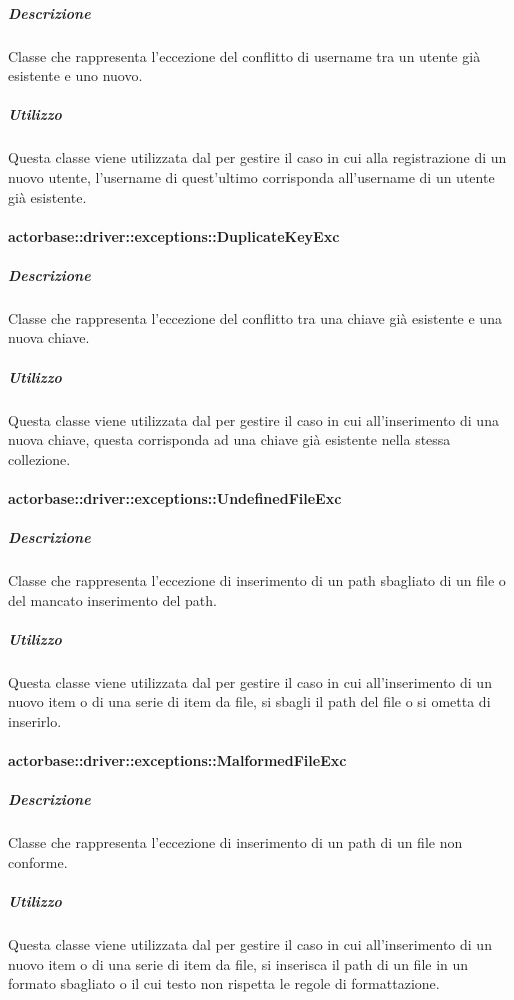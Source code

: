\documentclass{scalatekids-article}
\begin{document}
\subparagraph{Descrizione}

Classe che rappresenta l'eccezione del conflitto di username tra un utente già esistente e uno nuovo.

\subparagraph{Utilizzo}

Questa classe viene utilizzata dal  per gestire il caso in cui alla registrazione di un nuovo utente, l'username di quest'ultimo corrisponda all'username di un utente già esistente.

\paragraph{actorbase::driver::exceptions::DuplicateKeyExc}

\subparagraph{Descrizione}

Classe che rappresenta l'eccezione del conflitto tra una chiave già esistente e una nuova chiave.

\subparagraph{Utilizzo}

Questa classe viene utilizzata dal  per gestire il caso in cui all'inserimento di una nuova chiave, questa corrisponda ad una chiave già esistente nella stessa collezione.

\paragraph{actorbase::driver::exceptions::UndefinedFileExc}

\subparagraph{Descrizione}

Classe che rappresenta l'eccezione di inserimento di un path sbagliato di un file o del mancato inserimento del path.

\subparagraph{Utilizzo}

Questa classe viene utilizzata dal  per gestire il caso in cui all'inserimento di un nuovo item o di una serie di item da file, si sbagli il path del file o si ometta di inserirlo.

\paragraph{actorbase::driver::exceptions::MalformedFileExc}

\subparagraph{Descrizione}

Classe che rappresenta l'eccezione di inserimento di un path di un file non conforme.

\subparagraph{Utilizzo}

Questa classe viene utilizzata dal  per gestire il caso in cui all'inserimento di un nuovo item o di una serie di item da file, si inserisca il path di un file in un formato sbagliato o il cui testo non rispetta le regole di formattazione.
\end{document}
